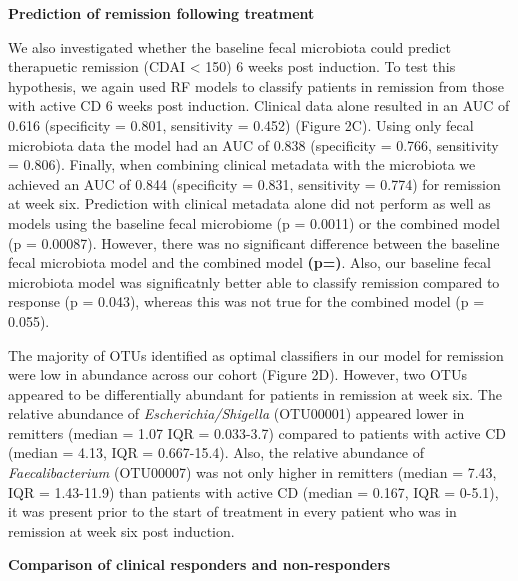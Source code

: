 \documentclass[11pt,]{article}
\begin{document}
\textbf{Prediction of remission following treatment}

We also investigated whether the baseline fecal microbiota could predict
therapuetic remission (CDAI \textless{} 150) 6 weeks post induction. To
test this hypothesis, we again used RF models to classify patients in
remission from those with active CD 6 weeks post induction. Clinical
data alone resulted in an AUC of 0.616 (specificity = 0.801, sensitivity
= 0.452) (Figure 2C). Using only fecal microbiota data the model had an
AUC of 0.838 (specificity = 0.766, sensitivity = 0.806). Finally, when
combining clinical metadata with the microbiota we achieved an AUC of
0.844 (specificity = 0.831, sensitivity = 0.774) for remission at week
six. Prediction with clinical metadata alone did not perform as well as
models using the baseline fecal microbiome (p = 0.0011) or the combined
model (p = 0.00087). However, there was no significant difference
between the baseline fecal microbiota model and the combined model
\textbf{(p=)}. Also, our baseline fecal microbiota model was
significatnly better able to classify remission compared to response (p
= 0.043), whereas this was not true for the combined model (p = 0.055).

The majority of OTUs identified as optimal classifiers in our model for
remission were low in abundance across our cohort (Figure 2D). However,
two OTUs appeared to be differentially abundant for patients in
remission at week six. The relative abundance of
\emph{Escherichia/Shigella} (OTU00001) appeared lower in remitters
(median = 1.07 IQR = 0.033-3.7) compared to patients with active CD
(median = 4.13, IQR = 0.667-15.4). Also, the relative abundance of
\emph{Faecalibacterium} (OTU00007) was not only higher in remitters
(median = 7.43, IQR = 1.43-11.9) than patients with active CD (median =
0.167, IQR = 0-5.1), it was present prior to the start of treatment in
every patient who was in remission at week six post induction.

\textbf{Comparison of clinical responders and non-responders}
\end{document}
